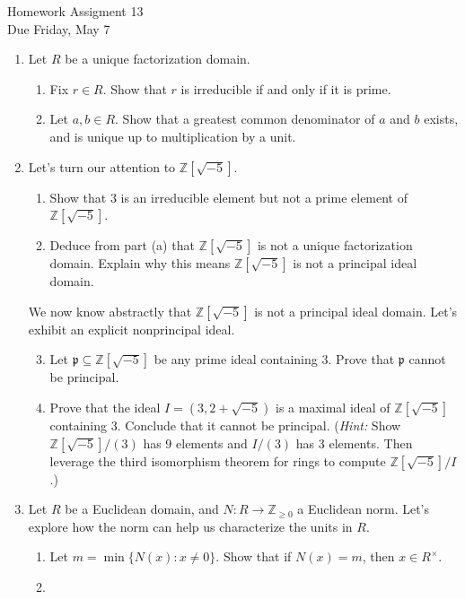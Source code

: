 \documentclass[11pt]{article}
\newcommand{\bZ}{\mathbb{Z}}
\newcommand{\fp}{\mathfrak{p}}
\begin{document}
\begin{center}
  \Large {Homework Assigment 13}\\
  \small {Due Friday, May 7}
\end{center}
\begin{enumerate}
  \item{
  Let $R$ be a unique factorization domain.
  \begin{enumerate}
    \item{
    Fix $r\in R$.  Show that $r$ is irreducible if and only if it is prime.
    }
    \item{
    Let $a,b\in R$.  Show that a greatest common denominator of $a$ and $b$ exists, and is unique up to multiplication by a unit.
    }
  \end{enumerate}
  }
  \item{
  Let's turn our attention to $\bZ[\sqrt{-5}]$.
  \begin{enumerate}
    \item{
    Show that $3$ is an irreducible element but not a prime element of $\bZ[\sqrt{-5}]$.
    }
    \item{
    Deduce from part (a) that $\bZ[\sqrt{-5}]$ is not a unique factorization domain.  Explain why this means $\bZ[\sqrt{-5}]$ is not a principal ideal domain.
    }
  \end{enumerate}
  We now know abstractly that $\bZ[\sqrt{-5}]$ is not a principal ideal domain.  Let's exhibit an explicit nonprincipal ideal.
  \begin{enumerate}
    \setcounter{enumii}{2}
    \item{
    Let $\fp\subseteq\bZ[\sqrt{-5}]$ be any prime ideal containing 3.  Prove that $\fp$ cannot be principal.
    }
    \item{
    Prove that the ideal $I = (3,2+\sqrt{-5})$ is a maximal ideal of $\bZ[\sqrt{-5}]$ containing 3.  Conclude that it cannot be principal.  (\textit{Hint:} Show $\bZ[\sqrt{-5}]/(3)$ has 9 elements and $I/(3)$ has 3 elements.  Then leverage the third isomorphism theorem for rings to compute $\bZ[\sqrt{-5}]/I$.)
    }
  \end{enumerate}
  }
  \item{
  Let $R$ be a Euclidean domain, and $N:R\to\bZ_{\ge0}$ a Euclidean norm.  Let's explore how the norm can help us characterize the units in $R$.
  \begin{enumerate}
    \item{
    Let $m = \min\{N(x):x\not=0\}$.  Show that if $N(x)=m$, then $x\in R^\times$.
    }
    \item{
}
\end{enumerate}}
\end{enumerate}
\end{document}
